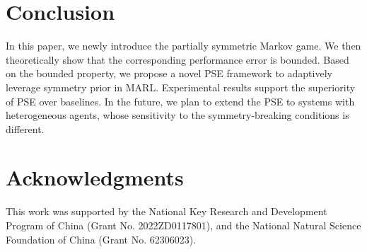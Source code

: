 \documentclass[letterpaper]{article} %
\theoremstyle{definition}
\begin{document}
\section{Conclusion}

In this paper, we newly introduce the partially symmetric Markov game. We then theoretically show that the corresponding performance error is bounded. Based on the bounded property, we propose a novel PSE framework to adaptively leverage symmetry prior in MARL. Experimental results support the superiority of PSE over baselines. In the future, we plan to extend the PSE to systems with heterogeneous agents, whose sensitivity to the symmetry-breaking conditions is different. 


\section*{Acknowledgments}
This work was supported by the National Key Research and Development Program of China (Grant No. 2022ZD0117801), and the National Natural Science Foundation of China (Grant No. 62306023).




\end{document}
